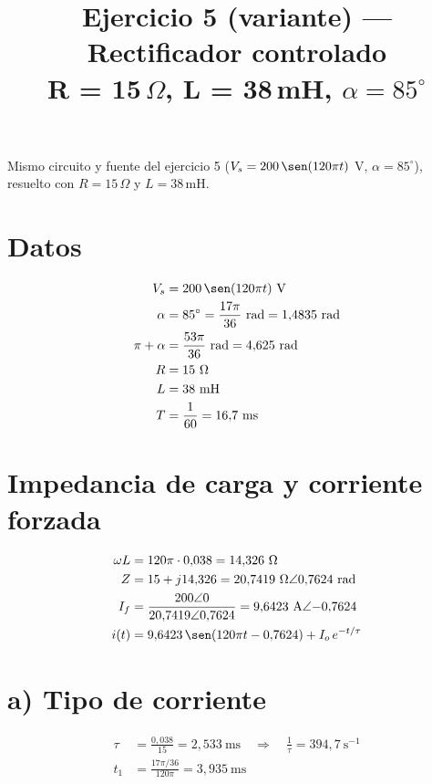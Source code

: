 \documentclass[11pt]{article}
\title{Ejercicio 5 (variante) --- Rectificador controlado\\ R = 15\,$\Omega$, L = 38\,mH, $\alpha=85^\circ$}
\author{}
\date{}
\begin{document}
\maketitle

Mismo circuito y fuente del ejercicio 5 ($V_s = 200\,\sen(120\pi t)$ V,
$\alpha=85^\circ$), resuelto con $R=15\,\Omega$ y $L=38$\,mH.

\section*{Datos}

\begin{align*}
V_s &= 200\,\sen(120\pi t)\ \text{V} \\
\alpha &= 85^\circ = \frac{17\pi}{36}\ \text{rad} = 1{,}4835\ \text{rad} \\
\pi+\alpha &= \frac{53\pi}{36}\ \text{rad} = 4{,}625\ \text{rad} \\
R &= 15\ \Omega \\
L &= 38\ \text{mH} \\
T &= \frac{1}{60} = 16{,}7\ \text{ms}
\end{align*}

\section*{Impedancia de carga y corriente forzada}

\begin{align*}
\omega L &= 120\pi \cdot 0{,}038 = 14{,}326\ \Omega \\
Z &= 15 + j14{,}326 = 20{,}7419\ \Omega \angle 0{,}7624\ \text{rad} \\
I_f &= \frac{200\angle 0}{20{,}7419\angle 0{,}7624} = 9{,}6423\ \text{A}\angle{-0{,}7624} \\
i(t) &= 9{,}6423\,\sen(120\pi t - 0{,}7624) + I_o\,e^{-t/\tau}
\end{align*}

\section*{a) Tipo de corriente}

\begin{align*}
\tau &= \frac{0{,}038}{15} = 2{,}533\ \text{ms} \quad \Rightarrow \quad \frac{1}{\tau} = 394{,}7\ \text{s}^{-1} \\
t_1 &= \frac{17\pi/36}{120\pi} = 3{,}935\ \text{ms}
\end{align*}
\end{document}
